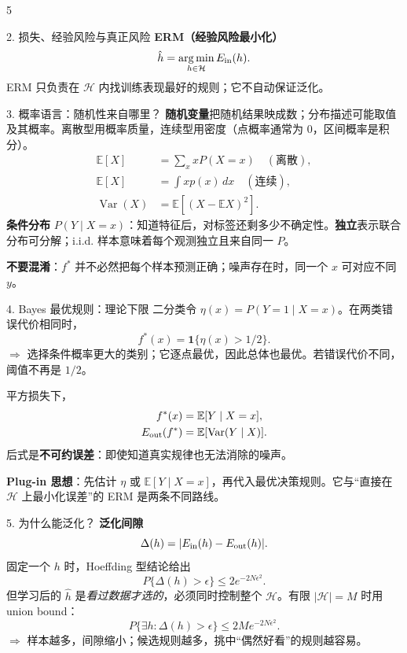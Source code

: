 \documentclass[a4paper,landscape,fontset=fandol]{ctexart}
\newcommand{\term}[1]{\textbf{\color{teal!80!black}#1}}
\newcommand{\warn}[1]{\textbf{\color{red}#1}}
\newcommand{\sense}[1]{\textcolor{muted}{\ensuremath{\Rightarrow} #1}}
\newcommand{\E}{\mathbb{E}}
\newcommand{\ind}{\mathbf{1}}
\newcommand{\argmin}{\operatorname*{arg\,min}}
\begin{document}
\begin{multicols*}{5}
\begin{boxx}{2. 损失、经验风险与真正风险}
\term{ERM（经验风险最小化）}
\[
\hat h=\argmin_{h\in\mathcal H}E_{\rm in}(h).
\]
ERM 只负责在 $\mathcal H$ 内找训练表现最好的规则；它不自动保证泛化。
\end{boxx}

\columnbreak

\begin{boxx}{3. 概率语言：随机性来自哪里？}
\term{随机变量}把随机结果映成数；分布描述可能取值及其概率。离散型用概率质量，连续型用密度（点概率通常为 0，区间概率是积分）。
\[
\begin{aligned}
\E[X]&=\sum_x xP(X=x)\quad(\text{离散}),\\
\E[X]&=\int x p(x)\,dx\quad(\text{连续}),\\
\operatorname{Var}(X)&=\E[(X-\E X)^2].
\end{aligned}
\]
\term{条件分布} $P(Y\mid X=x)$：知道特征后，对标签还剩多少不确定性。\term{独立}表示联合分布可分解；i.i.d. 样本意味着每个观测独立且来自同一 $P$。

\warn{不要混淆}：$f^*$ 并不必然把每个样本预测正确；噪声存在时，同一个 $x$ 可对应不同 $y$。
\end{boxx}

\begin{boxx}{4. Bayes 最优规则：理论下限}
二分类令 $\eta(x)=P(Y=1\mid X=x)$。在两类错误代价相同时，
\[
f^*(x)=\ind\{\eta(x)>1/2\}.
\]
\sense{选择条件概率更大的类别；它逐点最优，因此总体也最优。若错误代价不同，阈值不再是 $1/2$。}

平方损失下，
\[
\begin{aligned}
f^*(x)&=\E[Y\mid X=x],\\
E_{\rm out}(f^*)&=\E[\operatorname{Var}(Y\mid X)].
\end{aligned}
\]
后式是\term{不可约误差}：即使知道真实规律也无法消除的噪声。

\term{Plug-in 思想}：先估计 $\eta$ 或 $\E[Y\mid X=x]$，再代入最优决策规则。它与“直接在 $\mathcal H$ 上最小化误差”的 ERM 是两条不同路线。
\end{boxx}

\columnbreak

\begin{boxx}{5. 为什么能泛化？}
\term{泛化间隙}
\[
\Delta(h)=|E_{\rm in}(h)-E_{\rm out}(h)|.
\]
固定一个 $h$ 时，Hoeffding 型结论给出
\[
P\{\Delta(h)>\epsilon\}\le 2e^{-2N\epsilon^2}.
\]
但学习后的 $\hat h$ 是\emph{看过数据才选的}，必须同时控制整个 $\mathcal H$。有限 $|\mathcal H|=M$ 时用 union bound：
\[
P\{\exists h:\Delta(h)>\epsilon\}\le 2M e^{-2N\epsilon^2}.
\]
\sense{样本越多，间隙缩小；候选规则越多，挑中“偶然好看”的规则越容易。}


\end{boxx}
\end{multicols*}
\end{document}
